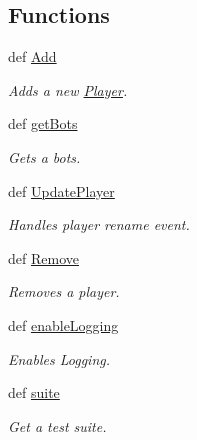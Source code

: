 \subsection*{Functions}
\begin{DoxyCompactItemize}
\item 
def \hyperlink{namespace_player_a7afb4f3ed0dc5209e4e8d4a28fb2e5cb}{Add}
\begin{DoxyCompactList}\small\item\em Adds a new \hyperlink{namespace_player}{Player}. \item\end{DoxyCompactList}\item 
def \hyperlink{namespace_player_aa5fb66d32493d33b1b64665e26b54aa5}{getBots}
\begin{DoxyCompactList}\small\item\em Gets a bots. \item\end{DoxyCompactList}\item 
def \hyperlink{namespace_player_a61462686e6399e37ccd208d65b523de2}{UpdatePlayer}
\begin{DoxyCompactList}\small\item\em Handles player rename event. \item\end{DoxyCompactList}\item 
def \hyperlink{namespace_player_a844c8f2121893f0c340b23ceedc4a6d2}{Remove}
\begin{DoxyCompactList}\small\item\em Removes a player. \item\end{DoxyCompactList}\item 
def \hyperlink{namespace_player_a83914537581346383eaeded9e3cc688d}{enableLogging}
\begin{DoxyCompactList}\small\item\em Enables Logging. \item\end{DoxyCompactList}\item 
\hypertarget{namespace_player_a209d226501da7dd7d3cc3989187af48a}{
def \hyperlink{namespace_player_a209d226501da7dd7d3cc3989187af48a}{suite}}
\label{namespace_player_a209d226501da7dd7d3cc3989187af48a}

\begin{DoxyCompactList}\small\item\em Get a test suite. \item\end{DoxyCompactList}\end{DoxyCompactItemize}
